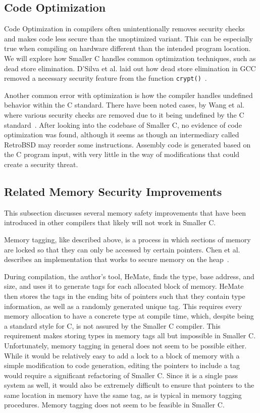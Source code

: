 \documentclass[sigconf, anonymous]{acmart}
\newcommand{\code}[1]{\texttt{#1}}
\begin{document}
\subsection{Code Optimization}
Code Optimization in compilers often unintentionally removes security checks and makes code less secure than the unoptimized variant. This can be especially true when compiling on hardware different than the intended program location. We will explore how Smaller C handles common optimization techniques, such as dead store elimination. D’Silva et al. laid out how dead store elimination in GCC removed a necessary security feature from the function \code{crypt()}~\cite{DSilva:Correctness}. 

Another common error with optimization is how the compiler handles undefined behavior within the C standard. There have been noted cases, by Wang et al. where various security checks are removed due to it being undefined by the C standard~\cite{Wang:Optimization}. After looking into the codebase of Smaller C, no evidence of code optimization was found, although it seems as though an intermediary called RetroBSD may reorder some instructions. Assembly code is generated based on the C program input, with very little in the way of modifications that could create a security threat.

\subsection{Related Memory Security Improvements}
This subsection discusses several memory safety improvements that have been introduced in other compilers that likely will not work in Smaller C.

Memory tagging, like described above, is a process in which sections of memory are locked so that they can only be accessed by certain pointers. Chen et al. describes an implementation that works to secure memory on the heap~\cite{Chen:HeMate}. 

During compilation, the author's tool, HeMate, finds the type, base address, and size, and uses it to generate tags for each allocated block of memory. HeMate then stores the tags in the ending bits of pointers such that they contain type information, as well as a randomly generated unique tag. This requires every memory allocation to have a concrete type at compile time, which, despite being a standard style for C, is not assured by the Smaller C compiler. This requirement makes storing types in memory tags all but impossible in Smaller C. Unfortunately, memory tagging in general does not seem to be possible either. While it would be relatively easy to add a lock to a block of memory with a simple modification to code generation, editing the pointers to include a tag would require a significant refactoring of Smaller C. Since it is a single pass system as well, it would also be extremely difficult to ensure that pointers to the same location in memory have the same tag, as is typical in memory tagging procedures. Memory tagging does not seem to be feasible in Smaller C. 
\end{document}
